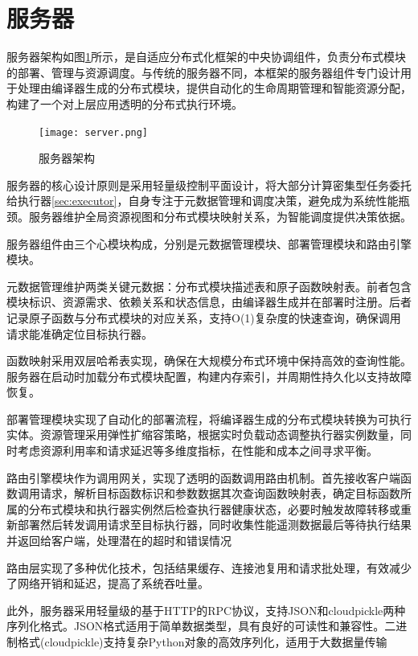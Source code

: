 \section{服务器}
\label{sec:server}

服务器架构如图\ref{fig:server}所示，是自适应分布式化框架的中央协调组件，负责分布式模块的部署、管理与资源调度。与传统的服务器不同，本框架的服务器组件专门设计用于处理由编译器生成的分布式模块，提供自动化的生命周期管理和智能资源分配，构建了一个对上层应用透明的分布式执行环境。

\begin{figure}[ht]
    \centering
    \texttt{[image: server.png]}
    \caption{服务器架构}
    \label{fig:server}
\end{figure}

服务器的核心设计原则是采用轻量级控制平面设计，将大部分计算密集型任务委托给执行器\ref{sec:executor}，自身专注于元数据管理和调度决策，避免成为系统性能瓶颈。服务器维护全局资源视图和分布式模块映射关系，为智能调度提供决策依据。

服务器组件由三个心模块构成，分别是元数据管理模块、部署管理模块和路由引擎模块。

元数据管理维护两类关键元数据：分布式模块描述表和原子函数映射表。前者包含模块标识、资源需求、依赖关系和状态信息，由编译器生成并在部署时注册。后者记录原子函数与分布式模块的对应关系，支持O(1)复杂度的快速查询，确保调用请求能准确定位目标执行器。

函数映射采用双层哈希表实现，确保在大规模分布式环境中保持高效的查询性能。服务器在启动时加载分布式模块配置，构建内存索引，并周期性持久化以支持故障恢复。

部署管理模块实现了自动化的部署流程，将编译器生成的分布式模块转换为可执行实体。资源管理采用弹性扩缩容策略，根据实时负载动态调整执行器实例数量，同时考虑资源利用率和请求延迟等多维度指标，在性能和成本之间寻求平衡。

路由引擎模块作为调用网关，实现了透明的函数调用路由机制。首先接收客户端函数调用请求，解析目标函数标识和参数数据其次查询函数映射表，确定目标函数所属的分布式模块和执行器实例然后检查执行器健康状态，必要时触发故障转移或重新部署然后转发调用请求至目标执行器，同时收集性能遥测数据最后等待执行结果并返回给客户端，处理潜在的超时和错误情况

路由层实现了多种优化技术，包括结果缓存、连接池复用和请求批处理，有效减少了网络开销和延迟，提高了系统吞吐量。

此外，服务器采用轻量级的基于HTTP的RPC协议，支持JSON和cloudpickle两种序列化格式。JSON格式适用于简单数据类型，具有良好的可读性和兼容性。二进制格式(cloudpickle)支持复杂Python对象的高效序列化，适用于大数据量传输

